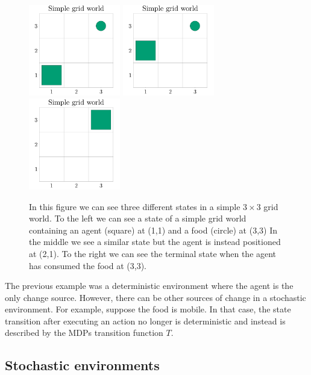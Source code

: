 \documentclass[12pt,A4]{report}
\theoremstyle{definition}
\begin{document}
\begin{figure}[H]
  \centering
  \includegraphics[width=4cm]{"./figures/SimpleGridWorld.png"}
  \includegraphics[width=4cm]{"./figures/SimpleGridWorld_up.png"}
  \includegraphics[width=4cm]{"./figures/SimpleGridWorld_terminal.png"}
  \caption{In this figure we can see three different states in a simple $3\times 3$ grid world. To the left we can see a state of a simple grid world containing an agent (square) at (1,1) and a food (circle) at (3,3)  In the middle we see a similar state but the agent is instead positioned at (2,1). To the right we can see the terminal state when the agent has consumed the food at (3,3).}
  \label{fig:simple_grid}
\end{figure}

The previous example was a deterministic environment where the agent is the only change source. However, there can be other sources of change in a stochastic environment. For example, suppose the food is mobile. In that case, the state transition after executing an action no longer is deterministic and instead is described by the MDPs transition function $T$. 

\subsection{Stochastic environments}
\end{document}
